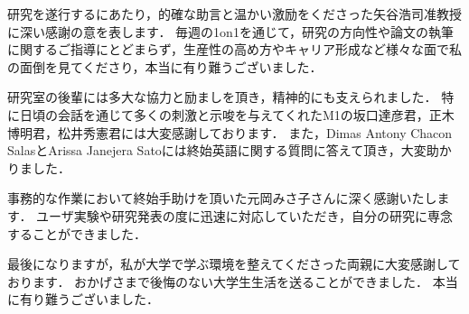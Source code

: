 
\begin{acknowledgements}

研究を遂行するにあたり，的確な助言と温かい激励をくださった矢谷浩司准教授に深い感謝の意を表します．
毎週の1on1を通じて，研究の方向性や論文の執筆に関するご指導にとどまらず，生産性の高め方やキャリア形成など様々な面で私の面倒を見てくださり，本当に有り難うございました．

研究室の後輩には多大な協力と励ましを頂き，精神的にも支えられました．
特に日頃の会話を通じて多くの刺激と示唆を与えてくれたM1の坂口達彦君，正木博明君，松井秀憲君には大変感謝しております．
また，Dimas Antony Chacon SalasとArissa Janejera Satoには終始英語に関する質問に答えて頂き，大変助かりました．

事務的な作業において終始手助けを頂いた元岡みさ子さんに深く感謝いたします．
ユーザ実験や研究発表の度に迅速に対応していただき，自分の研究に専念することができました．

最後になりますが，私が大学で学ぶ環境を整えてくださった両親に大変感謝しております．
おかげさまで後悔のない大学生生活を送ることができました．
本当に有り難うございました．

\end{acknowledgements}
